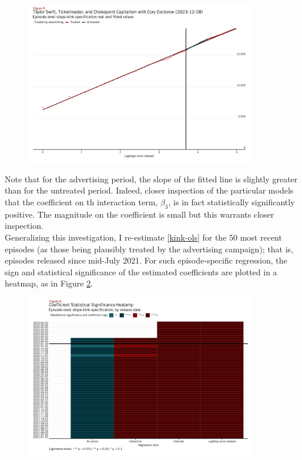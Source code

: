 \documentclass[11pt, letterpaper, twoside]{article}
\begin{document}
\begin{figure}[!htb]
  \centering
  \includegraphics[width=0.9\textwidth]{figures/tswift_daily_kink_plot.png}
  \caption{}
  \label{fig:tswift_fitted}
\end{figure}
  
Note that for the advertising period, the slope of the fitted line is slightly greater than for the untreated period. Indeed, closer inspection of the particular models that the coefficient on th  interaction term, $\beta_3$, is in fact statistically significantly positive. The magnitude on the coefficient is small but this warrants closer inspection.\\

Generalizing this investigation, I re-estimate \eqref{kink-ols} for the 50 most recent episodes (as those being plausibly treated by the advertising campaign); that is, episodes released since mid-July 2021. For such episode-specific regression, the sign and statistical significance of the estimated coefficients are plotted in a heatmap, as in Figure \ref{fig:kink-ols-heatmap}.\\ 

\begin{figure}
  \centering
  \includegraphics[width=0.9\textwidth]{figures/daily_kink_sig_heatmap.png}
  \caption{}
  \label{fig:kink-ols-heatmap}
\end{figure}
\end{document}
